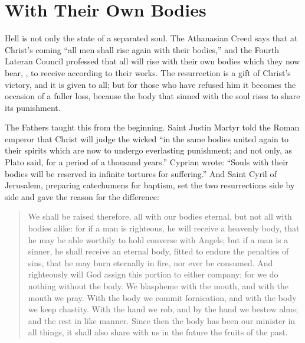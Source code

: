 \section{With Their Own Bodies}

Hell is not only the state of a separated soul. The Athanasian Creed says that at Christ's coming ``all men shall rise again with their bodies,'' and the Fourth Lateran Council professed that all will rise with their own bodies which they now bear, , to receive according to their works. The resurrection is a gift of Christ's victory, and it is given to all; but for those who have refused him it becomes the occasion of a fuller loss, because the body that sinned with the soul rises to share its punishment.

The Fathers taught this from the beginning. Saint Justin Martyr told the Roman emperor that Christ will judge the wicked ``in the same bodies united again to their spirits which are now to undergo everlasting punishment; and not only, as Plato said, for a period of a thousand years.'' Cyprian wrote: ``Souls with their bodies will be reserved in infinite tortures for suffering.'' And Saint Cyril of Jerusalem, preparing catechumens for baptism, set the two resurrections side by side and gave the reason for the difference:

\begin{quote}
We shall be raised therefore, all with our bodies eternal, but not all with bodies alike: for if a man is righteous, he will receive a heavenly body, that he may be able worthily to hold converse with Angels; but if a man is a sinner, he shall receive an eternal body, fitted to endure the penalties of sins, that he may burn eternally in fire, nor ever be consumed. And righteously will God assign this portion to either company; for we do nothing without the body. We blaspheme with the mouth, and with the mouth we pray. With the body we commit fornication, and with the body we keep chastity. With the hand we rob, and by the hand we bestow alms; and the rest in like manner. Since then the body has been our minister in all things, it shall also share with us in the future the fruits of the past.
\end{quote}

